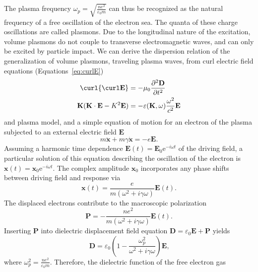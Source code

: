   The plasma frequency $\omega_p = \sqrt{\frac{ne^2}{\varepsilon_0m}}$ can thus be recognized as the natural frequency of a free oscillation of the electron sea. The quanta of these charge oscillations are called plasmons. Due to the longitudinal nature of the excitation, volume plasmons do not couple to transverse electromagnetic waves, and can only be excited by particle impact. We can derive the dispersion relation of the generalization of volume plasmons, traveling plasma waves, from curl electric field equations (Equations~\ref{eq:curlE})
 \begin{subequations}
 \begin{align}
 \curl{\curl \mathbf{E}} &= -\mu_0 \frac{\partial^2\mathbf{D}}{\partial t^2}\label{eq:curlE}\\
\mathbf{K}( \mathbf{K}\cdot \mathbf{E}-K^{ 2 }\mathbf{E} ) &=-\varepsilon ( \mathbf{K},\omega  ) \frac { { \omega  }^{ 2 } }{ { c }^{ 2 } } \mathbf{E}
 \end{align}
 \end{subequations}  
and plasma model, and a simple equation of motion for an electron of the plasma subjected to an external electric field $\mathbf{E}$
 \begin{equation}
m\ddot{\mathbf{x}} + m\gamma\dot{\mathbf{x}} = -e\mathbf{E}\text{.}
\end{equation}
Assuming a harmonic time dependence $\mathbf{E}( t )=\mathbf{E}_0\mathrm{e}^{-i\omega t}$ of the driving field, a particular solution of this equation describing the oscillation of the electron is $\mathbf{x} ( t ) = \mathbf{x}_0 \mathrm{e}^{-i\omega t} $. The complex amplitude $\mathbf{x}_0$ incorporates any phase shifts between driving field and response via
\begin{equation}
\mathbf{x} ( t ) = \frac{e}{m( \omega^2 + i\gamma\omega )}\mathbf{E}( t )\text{.}
\end{equation}
The displaced electrons contribute to the macroscopic polarization
\begin{equation}
\mathbf{P}=-\frac{ne^2}{m( \omega^2 + i\gamma\omega )}\mathbf{E}( t )\text{.}
\end{equation}
Inserting $\mathbf{P}$ into dielectric displacement field equation $\mathbf{D} = \varepsilon_0\mathbf{E} + \mathbf{P}$ yields
\begin{equation}
\mathbf{D} = \varepsilon_0(1-\frac{\omega_p^2}{\omega^2 + i\gamma\omega})\mathbf{E}\text{,}
\end{equation}
where $\omega_p^2 = \frac{ne^2}{\varepsilon_0m}$. Therefore, the dielectric function of the free electron gas
